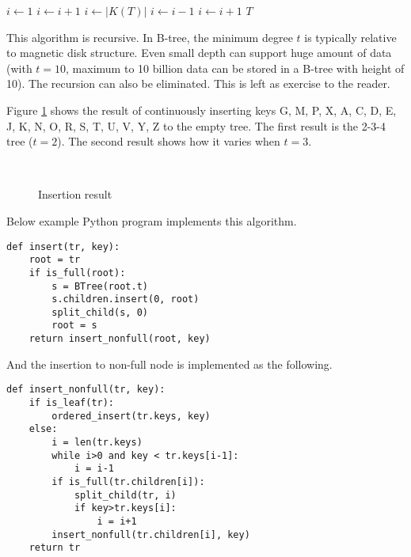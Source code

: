 \documentclass{article}
\begin{document}
\begin{algorithmic}[1]
    \State $i \gets 1$
      \State $i \gets i+1$
    \EndWhile
    \State {}
  \Else
    \State $i \gets |K(T)|$
      \State $i \gets i-1$
    \EndWhile
      \State {}
        \State $i \gets i+1$
      \EndIf
    \EndIf
    \State {}
  \EndIf
  \State \Return $T$
\EndFunction
\end{algorithmic}

This algorithm is recursive. In B-tree,
the minimum degree $t$ is typically relative to magnetic disk structure.
Even small depth can support huge amount of data
(with $t=10$, maximum to 10 billion data can be stored in a B-tree with height of 10).
The recursion can also be eliminated. This is left as exercise to the reader.

Figure \ref{fig:btree-insert} shows the result of continuously inserting
keys G, M, P, X, A, C, D, E, J, K, N, O, R, S, T, U, V, Y, Z to the empty tree.
The first result is the 2-3-4 tree ($t=2$). The second result shows how
it varies when $t=3$.

\begin{figure}[htbp]
  \centering
  \\
  \caption{Insertion result} \label{fig:btree-insert}
\end{figure}

Below example Python program implements this algorithm.
\lstset{language=Python}
\begin{lstlisting}
def insert(tr, key):
    root = tr
    if is_full(root):
        s = BTree(root.t)
        s.children.insert(0, root)
        split_child(s, 0)
        root = s
    return insert_nonfull(root, key)
\end{lstlisting}

And the insertion to non-full node is implemented as the following.

\begin{lstlisting}
def insert_nonfull(tr, key):
    if is_leaf(tr):
        ordered_insert(tr.keys, key)
    else:
        i = len(tr.keys)
        while i>0 and key < tr.keys[i-1]:
            i = i-1
        if is_full(tr.children[i]):
            split_child(tr, i)
            if key>tr.keys[i]:
                i = i+1
        insert_nonfull(tr.children[i], key)
    return tr
\end{lstlisting}
\end{document}
